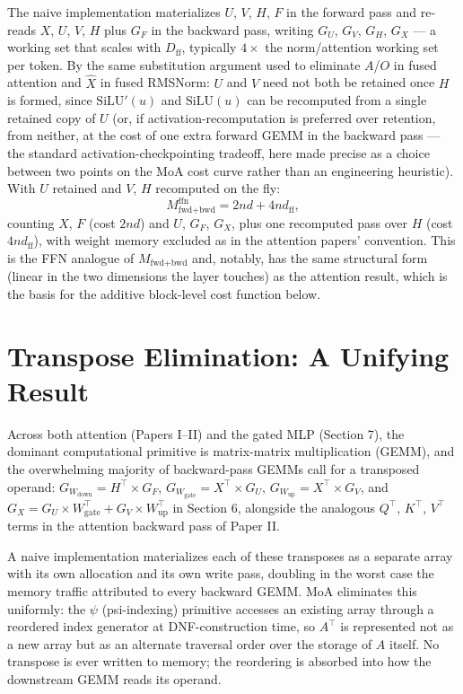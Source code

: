 \documentclass[11pt]{article}
\newcommand{\psii}{\psi}
\theoremstyle{definition}
\begin{document}
The naive implementation materializes $U$, $V$, $H$, $F$ in the forward
pass and re-reads $X$, $U$, $V$, $H$ plus $G_F$ in the backward pass,
writing $G_U$, $G_V$, $G_H$, $G_X$ --- a working set that scales with
$D_{\mathrm{ff}}$, typically $4\times$ the norm/attention working set
per token. By the same substitution argument used to eliminate $A$/$O$
in fused attention and $\hat X$ in fused RMSNorm: $U$ and $V$ need not
both be retained once $H$ is formed, since $\mathrm{SiLU}'(u)$ and
$\mathrm{SiLU}(u)$ can be recomputed from a single retained copy of $U$
(or, if activation-recomputation is preferred over retention, from
neither, at the cost of one extra forward GEMM in the backward pass ---
the standard activation-checkpointing tradeoff, here made precise as a
choice between two points on the MoA cost curve rather than an
engineering heuristic). With $U$ retained and $V$, $H$ recomputed on the
fly:
\[
M^{\mathrm{ffn}}_{\text{fwd+bwd}} = 2nd + 4nd_{\mathrm{ff}},
\]
counting $X$, $F$ (cost $2nd$) and $U$, $G_F$, $G_X$, plus one
recomputed pass over $H$ (cost $4nd_{\mathrm{ff}}$), with weight memory
excluded as in the attention papers' convention. This is the FFN
analogue of $M_{\text{fwd+bwd}}$ and, notably, has the same structural
form (linear in the two dimensions the layer touches) as the attention
result, which is the basis for the additive block-level cost function
below.

\section{Transpose Elimination: A Unifying Result}

Across both attention (Papers I--II) and the gated MLP (Section 7), the
dominant computational primitive is matrix-matrix multiplication (GEMM),
and the overwhelming majority of backward-pass GEMMs call for a
transposed operand: $G_{W_{\mathrm{down}}} = H^{\top}\times G_F$,
$G_{W_{\mathrm{gate}}} = X^{\top}\times G_U$, $G_{W_{\mathrm{up}}} =
X^{\top}\times G_V$, and $G_X = G_U\times W_{\mathrm{gate}}^{\top} +
G_V\times W_{\mathrm{up}}^{\top}$ in Section 6, alongside the analogous
$Q^{\top}$, $K^{\top}$, $V^{\top}$ terms in the attention backward pass
of Paper II.

A naive implementation materializes each of these transposes as a
separate array with its own allocation and its own write pass, doubling
in the worst case the memory traffic attributed to every backward GEMM.
MoA eliminates this uniformly: the $\psii$ (psi-indexing) primitive
accesses an existing array through a reordered index generator at
DNF-construction time, so $A^{\top}$ is represented not as a new array
but as an alternate traversal order over the storage of $A$ itself. No
transpose is ever written to memory; the reordering is absorbed into
how the downstream GEMM reads its operand.
\end{document}
